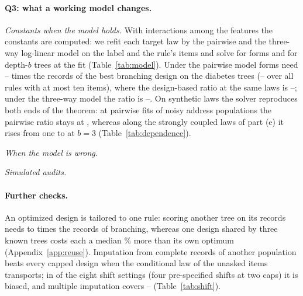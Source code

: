 

\paragraph{Q3: what a working model changes.}
\emph{Constants when the model holds.} \nCiSentence{} With interactions among the features the constants are computed: we refit each target law by the pairwise and the three-way log-linear model on the label and the rule's items and solve for forms and for depth-$b$ trees at the fit (Table~\ref{tab:model}). Under the pairwise model forms need \nModelTwoLo--\nModelTwoHi{} times the records of the best branching design on the diabetes trees (\nModelAllLo--\nModelAllHi{} over all rules with at most ten items), where the design-based ratio at the same laws is \nModelDesignLo--\nModelDesignHi; under the three-way model the ratio is \nModelThreeLo--\nModelThreeHi. On synthetic laws the solver reproduces both ends of the theorem: at pairwise fits of noisy address populations the pairwise ratio stays at \nDepFitTwoMax, whereas along the strongly coupled laws of part (e) it rises from one to \nDepRatioLast{} at $b=3$ (Table~\ref{tab:dependence}).

\emph{When the model is wrong.} \nMisspecSentence

\emph{Simulated audits.} \nAuditParagraph

\paragraph{Further checks.}
An optimized design is tailored to one rule: scoring another tree on its records needs \nReuseMin{} to \nReuseMax{} times the records of branching, whereas one design shared by three known trees costs each a median \nJointPenMed\% more than its own optimum (Appendix~\ref{app:reuse}). Imputation from complete records of another population beats every capped design when the conditional law of the unasked items transports; in \nImpBadN{} of the eight shift settings (four pre-specified shifts at two caps) it is biased, and multiple imputation covers \nMiCovLo--\nMiCovHi{} (Table~\ref{tab:shift}).
